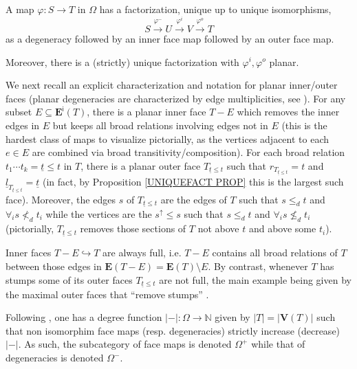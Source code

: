 \documentclass[a4paper,10pt
 ,draft
]{article}%
\begin{document}
\begin{proposition}\label{UNIQUEFACT PROP}
	A map $\varphi \colon S \to T$ in $\Omega$ has a factorization, unique up to unique isomorphisms,
\[
	S \xrightarrow{\varphi^{-}}
	U \xrightarrow{\varphi^{i}}
	V \xrightarrow{\varphi^{o}}
	T	
\]
as a degeneracy followed by an inner face map followed by an outer face map.

Moreover, there is a (strictly) unique factorization with $\varphi^i,\varphi^o$ planar. 
\end{proposition}

We next recall an explicit characterization and notation for planar inner/outer faces
(planar degeneracies are characterized by edge multiplicities, see \cite[Prop. 3.47(ii)]{BP17}).
For any subset $E \subseteq \boldsymbol{E}^{\mathsf{i}}(T)$, there is a planar inner face
$T-E$ which removes the inner edges in $E$ but keeps all broad relations involving edges not in $E$
(this is the hardest class of maps to visualize pictorially, as the vertices adjacent to each $e \in E$ are combined via broad transitivity/composition).
For each broad relation
$t_1 \cdots t_k = \underline{t} \leq t$ in $T$,
there is a planar outer face
$T_{\underline{t} \leq t}$
such that
$r_{T_{\underline{t} \leq t}} = t$ and
$\underline{l}_{T_{\underline{t} \leq t}} = \underline{t}$
(in fact, by Proposition \ref{UNIQUEFACT PROP} this is the largest such face).
Moreover, the edges $s$ of $T_{\underline{t} \leq t}$ are the edges of $T$ such that
$s \leq_d t$ and $\forall_{i} s \not <_d t_i$ while the vertices are the $s^{\uparrow} \leq s$ such that 
$s \leq_d t$ and $\forall_{i} s \not \leq_d t_i$ 
(pictorially, $T_{\underline{t} \leq t}$ removes those sections of $T$ not above $t$ and above some $t_i$).


\begin{remark}\label{INNFULL REM}
	Inner faces $T-E \hookrightarrow T$ are always full, i.e. $T-E$ contains all broad relations of $T$ between those edges in 
$\boldsymbol{E}(T-E) = \boldsymbol{E}(T) \setminus E$.
	By contrast, whenever $T$ has stumps some of its outer faces $T_{\underline{t} \leq t}$ are not full,
	the main example being given by the maximal outer faces
	that ``remove stumps'' \cite[Not. 5.41]{Per18}.
\end{remark}


\begin{remark}\label{DEGREE REM}
	Following \cite[Ex. 2.8]{BM11}, one has a degree function 
	$|-|\colon \Omega \to \mathbb{N}$ given by $|T|=|\boldsymbol{V}(T)|$
	such that non isomorphim face maps (resp. degeneracies) strictly increase (decrease) $|-|$.
	As such, the subcategory of face maps is denoted $\Omega^+$ while that of degeneracies is denoted $\Omega^-$.
\end{remark}
\end{document}
